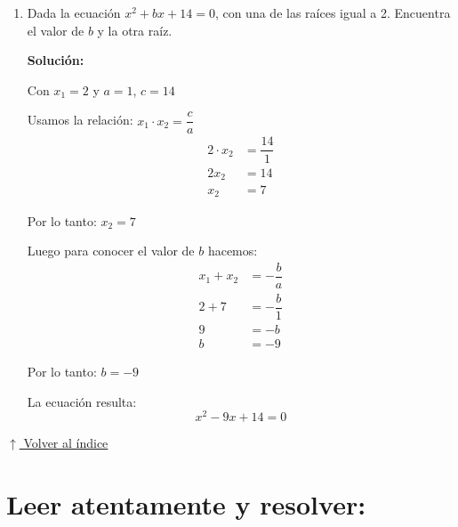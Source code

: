 \documentclass[12pt]{article}
\newcommand{\solucion}{%
    \vspace{0.8em}%
    \textbf{Solución:}%
}
\newcommand{\volverindice}{%
    \vspace{1em}%
    \begin{flushright}%
        \hyperlink{indice}{\small $\uparrow$ Volver al índice}%
    \end{flushright}%
}
\begin{document}
\begin{enumerate}[label=\alph*)]
Finalmente la ecuación es: $2x^2 - 6x = 0$

\item Dada la ecuación $x^2 + bx + 14 = 0$, con una de las raíces igual a 2. Encuentra el valor de $b$ y la otra raíz.

\solucion

Con $x_1 = 2$ y $a = 1$, $c = 14$

Usamos la relación: $x_1 \cdot x_2 = \dfrac{c}{a}$
\begin{align*}
2 \cdot x_2 &= \dfrac{14}{1} \\[0.3em]
2x_2 &= 14 \\[0.3em]
x_2 &= 7
\end{align*}

Por lo tanto: $\boxed{x_2 = 7}$

Luego para conocer el valor de $b$ hacemos:
\begin{align*}
x_1 + x_2 &= -\dfrac{b}{a} \\[0.3em]
2 + 7 &= -\dfrac{b}{1} \\[0.3em]
9 &= -b \\[0.3em]
b &= -9
\end{align*}

Por lo tanto: $\boxed{b = -9}$

La ecuación resulta:
\[
x^2 - 9x + 14 = 0
\]
\end{enumerate}
\volverindice
\newpage

\section[Problemas de aplicación]{Leer atentamente y resolver:}
\end{document}
